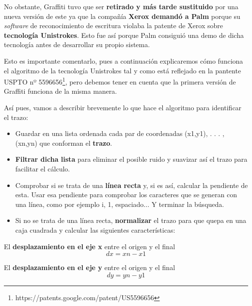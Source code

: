 \vspace{0.5cm}

No obstante, Graffiti tuvo que ser \textbf{retirado y más tarde sustituido} por una nueva versión de este ya que la compañía \textbf{Xerox demandó a Palm} porque su \textit{software} de reconocimiento de escritura violaba la patente de Xerox sobre \textbf{tecnología Unistrokes}. Esto fue así porque Palm consiguió una demo de dicha tecnología antes de desarrollar su propio sistema.

\vspace{0.5cm}

Esto es importante comentarlo, pues a continuación explicaremos cómo funciona el algoritmo de la tecnología Unistrokes tal y como está reflejado en la pantente USPTO nº 5596656\footnote{https://patents.google.com/patent/US5596656}, pero debemos  tener en cuenta que la primera versión de Graffiti funciona de la misma manera.

\vspace{0.5cm}

Así pues, vamos a describir brevemente lo que hace el algoritmo para identificar el trazo:

\vspace{0.5cm}

\begin{itemize}
 \item Guardar en una lista ordenada cada par de coordenadas (x1,y1), . . . , (xn,yn) que conforman el \textbf{trazo}.
 \item \textbf{Filtrar dicha lista} para eliminar el posible ruido y suavizar así el trazo para facilitar el cálculo.
 \item Comprobar si se trata de una \textbf{línea recta} y, si es así, calcular la pendiente de esta. Usar esa pendiente para comprobar los caracteres que se generan con una línea, como por ejemplo i, 1, espaciado... Y terminar la búsqueda.
 \item Si no se trata de una línea recta, \textbf{normalizar} el trazo para que quepa en una caja cuadrada y calcular las siguientes características:
 
 \end{itemize}
 
 El \textbf{desplazamiento en el eje x} entre el origen y el final
  \begin{equation}
dx=xn-x1
\end{equation}

 El \textbf{desplazamiento en el eje y} entre el origen y el final
  \begin{equation}
dy=yn-y1
\end{equation}

